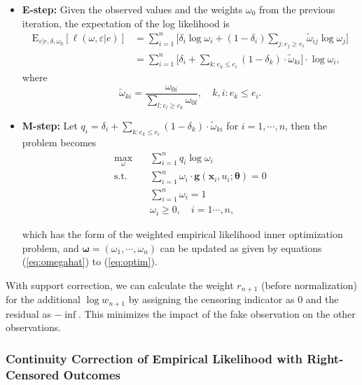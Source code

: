 \documentclass[article]{jss}
\renewcommand{\|}{\,|\,}
\begin{document}
\begin{itemize}
\item \textbf{E-step:} Given the observed values and the weights $\omega_0$ from the previous iteration, the expectation of the log likelihood is
\begin{equation}\label{eq:emestep}
\begin{split}
  \textrm{E}_{\varepsilon|e,\delta,\omega_0}[\ell(\omega,\varepsilon|e)]
  &= \sum_{i=1}^n \Big[\delta_i \log \omega_i +
    (1-\delta_i) \sum_{j: e_j\geq e_i} \tilde \omega_{ij} \log \omega_j\Big] \\
  &= \sum_{i=1}^n \Big[\delta_i + \sum_{k: e_k\leq e_i} (1-\delta_k)
      \cdot\tilde\omega_{ki}\Big]\cdot\log \omega_i,
\end{split}
\end{equation}
where
\[
  \tilde \omega_{ki} = \frac{\omega_{0i}}{\sum_{l: e_l\geq e_k}\omega_{0l}}, \quad k,i: e_k\leq e_i.
\]

\item \textbf{M-step:}
Let $q_i = \delta_i + \sum_{k: e_k\leq e_i} (1-\delta_k)\cdot \tilde \omega_{ki}$ for $i=1,\cdots,n$, then the problem becomes
\begin{equation}\label{eq:emmstep}
\begin{split}
  \max_{\omega}\quad & \sum_{i=1}^n q_i \log \omega_i \\
  \mbox{s.t.}\quad & \sum_{i=1}^n \omega_i\cdot \bm g(\bm x_i,u_i;\bm \theta) = 0 \\
  & \sum_{i=1}^n \omega_i = 1 \\
  & \omega_i \geq 0, \quad i=1\cdots,n,
\end{split}
\end{equation}

which has the form of the weighted empirical likelihood inner optimization problem, and $\bm \omega= (\omega_1,\cdots,\omega_n)$ can be updated as given by equations (\ref{eq:omegahat}) to (\ref{eq:optim}).

\end{itemize}

With support correction, we can calculate the weight \(r_{n+1}\) (before normalization) for the additional \(\log w_{n+1}\) by assigning the censoring indicator as \(0\) and the residual as \(-\inf\). This minimizes the impact of the fake observation on the other observations.

\hypertarget{continuity-correction-of-empirical-likelihood-with-right-censored-outcomes}{%
\subsubsection{Continuity Correction of Empirical Likelihood with Right-Censored Outcomes}\label{continuity-correction-of-empirical-likelihood-with-right-censored-outcomes}}
\end{document}
